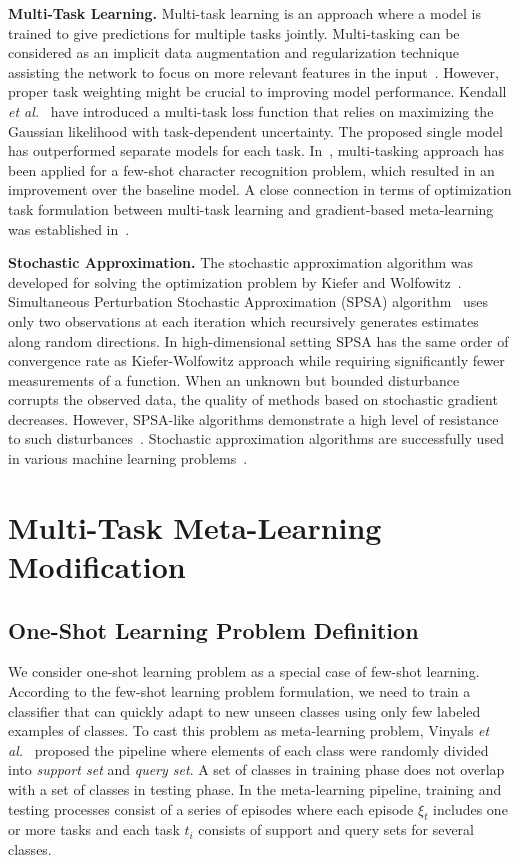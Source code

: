 \documentclass{article}
\begin{document}
{\bf Multi-Task Learning.} Multi-task learning is an approach where a model is trained to give predictions for multiple tasks jointly. Multi-tasking can be considered as an implicit data augmentation and regularization technique assisting the network to focus on more relevant features in the input~\cite{ruder2017overview}. However, proper task weighting might be crucial to improving model performance. Kendall {\it et al.}~\cite{kendall2018multi} have introduced a multi-task loss function that relies on maximizing the Gaussian likelihood with task-dependent uncertainty. The proposed single model has outperformed separate models for each task. In~\cite{boiarov2020simultaneous}, multi-tasking approach has been applied for a few-shot character recognition problem, which resulted in an improvement over the baseline model. A close connection in terms of optimization task formulation between multi-task learning and gradient-based meta-learning was established in~\cite{wang2021bridging}. 



{\bf Stochastic Approximation. }The stochastic approximation algorithm was developed for solving the optimization problem by Kiefer and Wolfowitz~\cite{kiefer1952stochastic}. Simultaneous Perturbation Stochastic Approximation (SPSA) algorithm~\cite{spall1992multivariate} uses only two observations at each iteration which recursively generates estimates along random directions. In high-dimensional setting SPSA has the same order of convergence rate as Kiefer-Wolfowitz approach while requiring significantly fewer measurements of a function. When an unknown but bounded disturbance corrupts the observed data, the quality of methods based on stochastic gradient decreases. However, SPSA-like algorithms demonstrate a high level of resistance to such disturbances~\cite{granichin2015randomized}. Stochastic approximation algorithms are successfully used in various machine learning problems~\cite{granichin2015randomized}.

\section{Multi-Task Meta-Learning Modification}

\subsection{One-Shot Learning Problem Definition}

We consider one-shot learning problem as a special case of few-shot learning. According to the few-shot learning problem formulation, we need to train a classifier that can quickly adapt to new unseen classes using only few labeled examples of classes. To cast this problem as meta-learning problem, Vinyals  {\it et al.}~\cite{vinyals2016matching} proposed the pipeline where elements of each class were randomly divided into {\it support set} and {\it query set}. A set of classes in training phase does not overlap with a set of classes in testing phase. In the meta-learning pipeline, training and testing processes consist of a series of episodes where each episode $\xi_t$ includes one or more tasks and each task $t_i$ consists of support and query sets for several classes.
\end{document}

